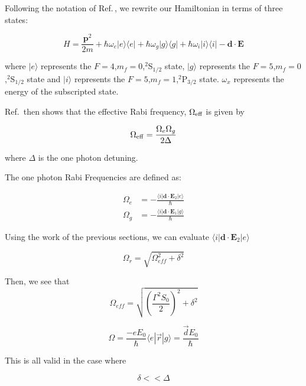 Following the notation of Ref.\,\cite{Young1997363}, we rewrite our Hamiltonian in terms of three states:

\begin{equation}
H=\frac{\mathbf{p}^2}{2m} + 
\hbar\omega_e |e\rangle\langle e | +
\hbar\omega_g |g\rangle\langle g | +
\hbar\omega_i |i\rangle\langle i | -
\mathbf{d}\cdot\mathbf{E}
\end{equation}

where $|e\rangle$ represents the $F=4$,$m_f=0$,$^2$S$_{1/2}$ state, $|g\rangle$ represents the $F=5$,$m_f=0$,$^2$S$_{1/2}$ state and $|i\rangle$ represents the $F=5$,$m_f=1$,$^2$P$_{3/2}$ state. $\omega_x$ represents the energy of the subscripted state.

Ref.\,\cite{Young1997363} then shows that the effective Rabi frequency, $\Omega_{\textnormal{eff}}$ is given by 

\begin{equation}
\Omega_{\rm eff}=\frac{\Omega_{e} \Omega_{g}}{2 \Delta}
\end{equation}

where $\Delta$ is the one photon detuning. %

The one photon Rabi Frequencies are defined as:

\begin{align}
\Omega_e&=-\frac{\langle i | \mathbf{d}\cdot \mathbf{E}_2 | e\rangle }{\hbar}\\
\Omega_g&=-\frac{\langle i | \mathbf{d}\cdot \mathbf{E}_1 | g\rangle}{\hbar}
\end{align}

Using the work of the previous sections, we can evaluate $\langle i | \mathbf{d}\cdot \mathbf{E}_2 | e\rangle$

\begin{equation}
\Omega_\mathit{r}=\sqrt{\Omega_\mathit{eff}^2+\delta^2}
\end{equation}

Then, we see that 
\begin{equation}
\Omega_\mathit{eff}=\sqrt{\left(\frac{\Gamma^2S_0}{2}\right)^2 + \delta^2}
\end{equation}

\begin{equation}
\Omega = \frac{-eE_0}{\hbar}\langle e |\vec{r}|g\rangle=\frac{\vec{d}E_0}{\hbar}
\end{equation}

This is all valid in the case where 

\begin{equation}
\delta<<\Delta
\end{equation}


